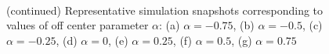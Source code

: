 \documentclass[../../master_thesis_np.tex]{subfiles}
\begin{document}
\begin{figure}[hbtp]
			\\
			\caption[]{}
		\end{figure}
		\begin{figure}[t]
			\centering
			\ContinuedFloat
			
			\caption{(continued) Representative simulation snapshots corresponding to values of off center parameter $\alpha$: (a) $\alpha = -0.75$, (b) $\alpha = -0.5$, (c) $\alpha = -0.25$, (d) $\alpha = 0$, (e) $\alpha = 0.25$, (f) $\alpha = 0.5$, (g) $\alpha = 0.75$}
			\label{fig:lj_oc_situa}
		\end{figure}
		
\end{document}
